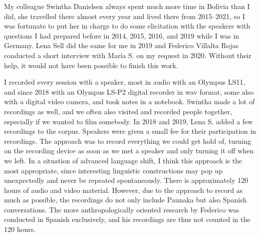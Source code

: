 My colleague Swintha Danielsen always spent much more time in Bolivia than I did, she travelled there almost every year and lived there from 2015–2021, so I was fortunate to put her in charge to do some elicitation with the speakers with questions I had prepared before in 2014, 2015, 2016, and 2019 while I was in Germany. Lena Sell did the same for me in 2019 and Federico Villalta Rojas conducted a short interview with María S. on my request in 2020. Without their help, it would not have been possible to finish this work.

I recorded every session with a speaker, most in audio with an Olympus LS11, and since 2018 with an Olympus LS-P2 digital recorder in wav format, some also with a digital video camera, and took notes in a notebook. Swintha made a lot of recordings as well, and we often also visited and recorded people together, especially if we wanted to film somebody. In 2018 and 2019, Lena S. added a few recordings to the corpus. Speakers were given a small fee for their participation in recordings.
The approach was to record everything we could get hold of, turning on the recording device as soon as we met a speaker and only turning it off when we left. In a situation of advanced language shift, I think this approach is the most appropriate, since interesting linguistic constructions may pop up unexpectedly and never be repeated spontaneously. There is approximately 120 hours of audio and video material. However, due to the approach to record as much as possible, the recordings do not only include Paunaka but also Spanish conversations. The more anthropologically oriented research by Federico was conducted in Spanish exclusively, and his recordings are thus not counted in the 120 hours.

